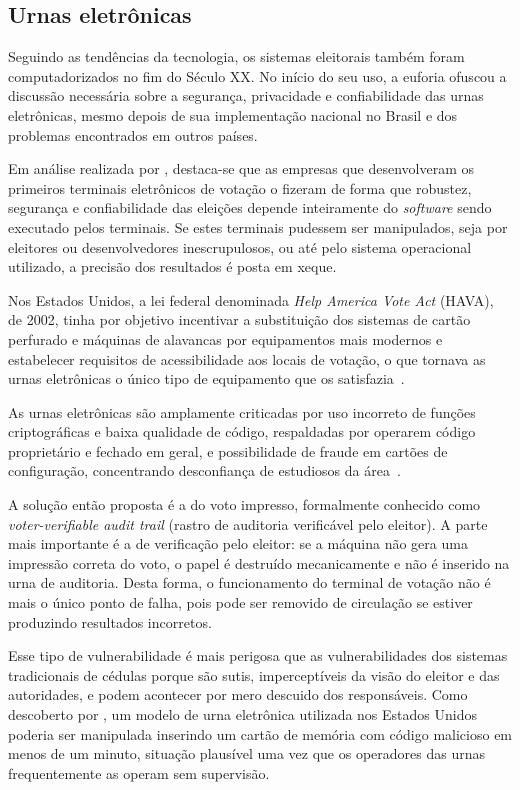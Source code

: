 \subsection{Urnas eletrônicas}

Seguindo as tendências da tecnologia, os sistemas eleitorais também foram
computadorizados no fim do Século XX. No início do seu uso, a euforia ofuscou a
discussão necessária sobre a segurança, privacidade e confiabilidade das urnas
eletrônicas, mesmo depois de sua implementação nacional no Brasil e dos
problemas encontrados em outros países.

Em análise realizada por \textcite{kohno2004analysis}, destaca-se que as
empresas que desenvolveram os primeiros terminais eletrônicos de votação o
fizeram de forma que robustez, segurança e confiabilidade das eleições depende
inteiramente do \textit{software} sendo executado pelos terminais. Se estes
terminais pudessem ser manipulados, seja por eleitores ou desenvolvedores
inescrupulosos, ou até pelo sistema operacional utilizado, a precisão dos
resultados é posta em xeque.

Nos Estados Unidos, a lei federal denominada \textit{Help America Vote Act}
(HAVA), de 2002, tinha por objetivo incentivar a substituição dos sistemas de
cartão perfurado e máquinas de alavancas por equipamentos mais modernos e
estabelecer requisitos de acessibilidade aos locais de votação, o que tornava
as urnas eletrônicas o único tipo de equipamento que os
satisfazia~\cite{davis1996direct}.

As urnas eletrônicas são amplamente criticadas por uso incorreto de funções
criptográficas e baixa qualidade de código, respaldadas por operarem código
proprietário e fechado em geral, e possibilidade de fraude em cartões de
configuração, concentrando desconfiança de estudiosos da
área~\cite{feldman2006security}.

A solução então proposta é a do voto impresso, formalmente
conhecido como \textit{voter-verifiable audit trail} (rastro de auditoria
verificável pelo eleitor). A parte mais importante é a de verificação pelo
eleitor: se a máquina não gera uma impressão correta do voto, o papel é
destruído mecanicamente e não é inserido na urna de auditoria. Desta forma, o
funcionamento do terminal de votação não é mais o único ponto de falha, pois
pode ser removido de circulação se estiver produzindo resultados incorretos.

Esse tipo de vulnerabilidade é mais perigosa que as vulnerabilidades dos
sistemas tradicionais de cédulas porque são sutis, imperceptíveis da visão do
eleitor e das autoridades, e podem acontecer por mero descuido dos
responsáveis. Como descoberto por \textcite{feldman2006security}, um modelo de
urna eletrônica utilizada nos Estados Unidos poderia ser manipulada inserindo
um cartão de memória com código malicioso em menos de um minuto, situação
plausível uma vez que os operadores das urnas frequentemente as operam sem
supervisão.

